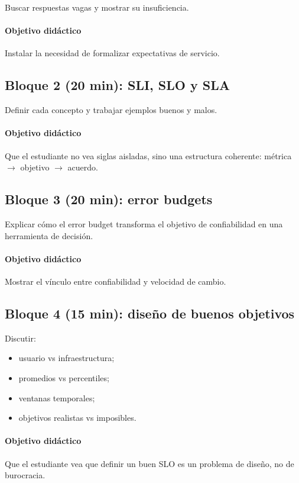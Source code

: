 \documentclass[variant=docente,cover=institutional,mode=screen]{ua-engineering-v6-article}
\begin{document}
Buscar respuestas vagas y mostrar su insuficiencia.

\paragraph{Objetivo didáctico}
Instalar la necesidad de formalizar expectativas de servicio.

\subsection*{Bloque 2 (20 min): SLI, SLO y SLA}
Definir cada concepto y trabajar ejemplos buenos y malos.

\paragraph{Objetivo didáctico}
Que el estudiante no vea siglas aisladas, sino una estructura coherente:
métrica $\to$ objetivo $\to$ acuerdo.

\subsection*{Bloque 3 (20 min): error budgets}
Explicar cómo el error budget transforma el objetivo de confiabilidad en una herramienta de decisión.

\paragraph{Objetivo didáctico}
Mostrar el vínculo entre confiabilidad y velocidad de cambio.

\subsection*{Bloque 4 (15 min): diseño de buenos objetivos}
Discutir:
\begin{itemize}
\item usuario vs infraestructura;
\item promedios vs percentiles;
\item ventanas temporales;
\item objetivos realistas vs imposibles.
\end{itemize}

\paragraph{Objetivo didáctico}
Que el estudiante vea que definir un buen SLO es un problema de diseño, no de burocracia.
\end{document}
